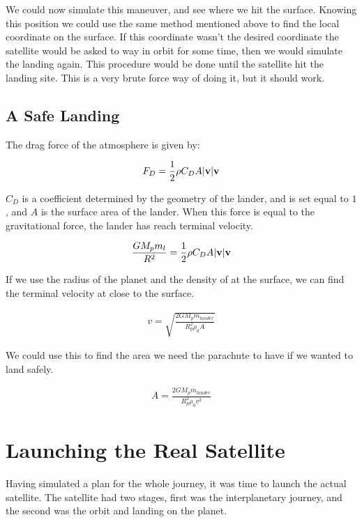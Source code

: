 \documentclass[a4paper, 10pt]{article}
\begin{document}
We could now simulate this maneuver, and see where we hit the surface. Knowing this position we could use the same method mentioned above to find the local coordinate on the surface. If this coordinate wasn't the desired coordinate the satellite would be asked to way in orbit for some time, then we would simulate the landing again. This procedure would be done until the satellite hit the landing site. This is a very brute force way of doing it, but it should work. 

\subsection{A Safe Landing}

The drag force of the atmosphere is given by:

\begin{align}
F_D = \frac{1}{2}\rho C_D A |\bold{v}| \bold{v}
\end{align}

$C_D$ is a coefficient determined by the geometry of the lander, and is set equal to $1$, and $A$ is the surface area of the lander. When this force is equal to the gravitational force, the lander has reach terminal velocity.

\begin{align}
\frac{GM_p m_l}{R^2} = \frac{1}{2}\rho C_D A |\bold{v}| \bold{v}
\end{align}

If we use the radius of the planet and the density of at the surface, we can find the terminal velocity at close to the surface.

\begin{align}
v = \sqrt{\frac{2GM_p m_{lander}}{R_p^2 \rho_0 A}}
\end{align}

We could use this to find the area we need the parachute to have if we wanted to land safely. 

\begin{align}
A = \frac{2GM_p m_{lander}}{R_p^2 \rho_0 v^2}
\end{align}


\section{Launching the Real Satellite}
Having simulated a plan for the whole journey, it was time to launch the actual satellite. The satellite had two stages, first was the interplanetary journey, and the second was the orbit and landing on the planet.\\
\end{document}
